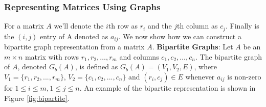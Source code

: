 	\subsubsection*{Representing Matrices Using Graphs}
	For a matrix $A$ we'll denote the $i$th row as $r_i$ and the $j$th column
	as $c_j$. Finally is the $(i,j)$ entry of A denoted as $a_{ij}$. We now show how
	we can
	construct a bipartite graph representation from a matrix $A$. \newline
	\textbf{Bipartite Graphs}: Let $A$ be an $m \times n$ matrix with rows $r_1,
	r_2, \dots, r_m$ and columns $c_1, c_2, \dots, c_n$. The bipartite graph of $A$,
	denoted $G_b(A)$, is defined as $G_b(A) = (V_1, V_2, E)$, where $V_1 = \{r_1,
	r_2, ..., r_m\}$, $V_2 = \{c_1, c_2, ..., c_n\}$ and $(r_i, c_j) \in E$ whenever
	$a_{ij}$ is non-zero for $1 \leq i \leq m, 1 \leq j \leq n$.  An example of the
	bipartite representation is shown in Figure \ref{fig:bipartite}.
